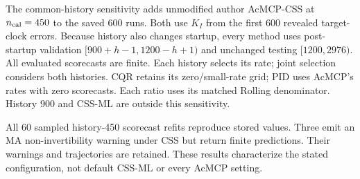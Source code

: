 The common-history sensitivity adds unmodified author AcMCP-CSS at
$n_{\rm cal}=450$ to the saved $600$ runs. Both use $K_I$ from the first 600
revealed target-clock errors. Because history also changes startup, every method
uses post-startup validation $[900+h-1,1200-h+1)$ and unchanged testing
$[1200,2976)$. All evaluated scorecasts are finite. Each history selects its rate;
joint selection considers both histories. CQR retains its zero/small-rate grid;
PID uses AcMCP's rates with zero scorecasts. Each ratio uses its matched Rolling
denominator. History 900 and CSS-ML are outside this sensitivity.

All 60 sampled history-450 scorecast refits reproduce stored values. Three emit
an MA non-invertibility warning under CSS but return finite predictions. Their
warnings and trajectories are retained. These results characterize the stated
configuration, not default CSS-ML or every AcMCP setting.
\begin{table}[!htbp]\centering\scriptsize
\caption{Complete history sensitivity on all four weather pairs. IS ratios are
averaged after pairing. Coverage is percent and Local is percentage points.}
\end{table}

